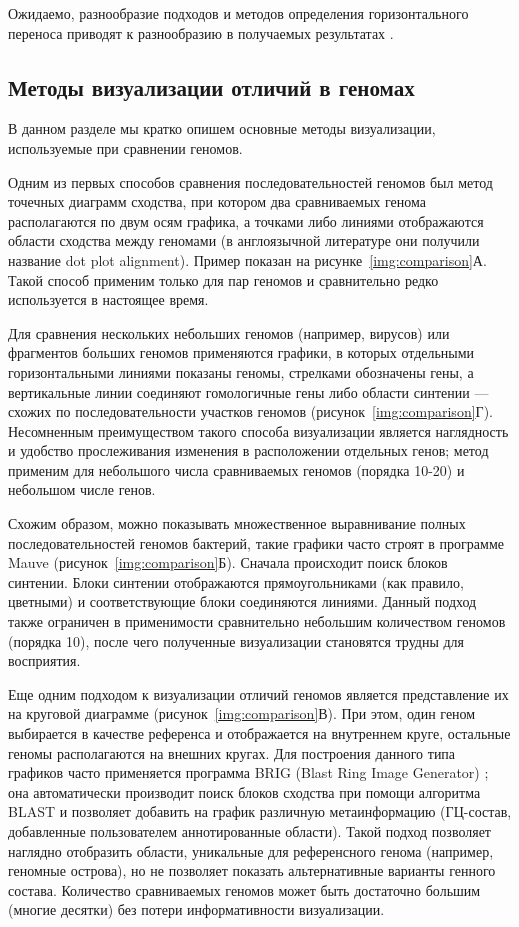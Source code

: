 Ожидаемо, разнообразие подходов и методов определения горизонтального переноса приводят к разнообразию в получаемых результатах \cite{ragan2006different}.

\subsection{Методы визуализации отличий в геномах}
В данном разделе мы кратко опишем основные методы визуализации, используемые при сравнении геномов.


Одним из первых способов сравнения последовательностей геномов был метод точечных диаграмм сходства, при котором два сравниваемых генома располагаются по двум осям графика, а точками либо линиями отображаются области сходства между геномами (в англоязычной литературе они получили название dot plot alignment). Пример показан на рисунке~\ref{img:comparison}А. Такой способ применим только для пар геномов и сравнительно редко используется в настоящее время.  

Для сравнения нескольких небольших геномов (например, вирусов) или фрагментов больших геномов применяются графики, в которых отдельными горизонтальными линиями показаны геномы, стрелками обозначены гены, а вертикальные линии соединяют гомологичные гены либо области синтении --- схожих по последовательности участков геномов (рисунок~\ref{img:comparison}Г). Несомненным преимуществом такого способа визуализации является наглядность и удобство прослеживания изменения в расположении отдельных генов; метод применим для небольшого числа сравниваемых геномов (порядка 10-20) и небольшом числе генов. 

Схожим образом, можно показывать множественное выравнивание полных последовательностей геномов бактерий, такие графики часто строят в программе Mauve \cite{darling2004mauve} (рисунок~\ref{img:comparison}Б). Сначала происходит поиск блоков синтении. Блоки синтении отображаются прямоугольниками (как правило, цветными) и соответствующие блоки соединяются линиями. Данный подход также ограничен в применимости сравнительно небольшим количеством геномов (порядка 10), после чего полученные визуализации становятся трудны для восприятия. 

Еще одним подходом к визуализации отличий геномов является представление их на круговой диаграмме (рисунок~\ref{img:comparison}В). При этом, один геном выбирается в качестве референса и отображается на внутреннем круге, остальные геномы располагаются на внешних кругах. Для построения данного типа графиков часто применяется программа BRIG (Blast Ring Image Generator) \cite{alikhan2011blast}; она автоматически производит поиск блоков сходства при помощи алгоритма BLAST и позволяет добавить на график различную метаинформацию (ГЦ-состав, добавленные пользователем аннотированные области). Такой подход позволяет наглядно отобразить области, уникальные для референсного генома (например, геномные острова), но не позволяет показать альтернативные варианты генного состава. Количество сравниваемых геномов может быть достаточно большим (многие десятки) без потери информативности визуализации. 


